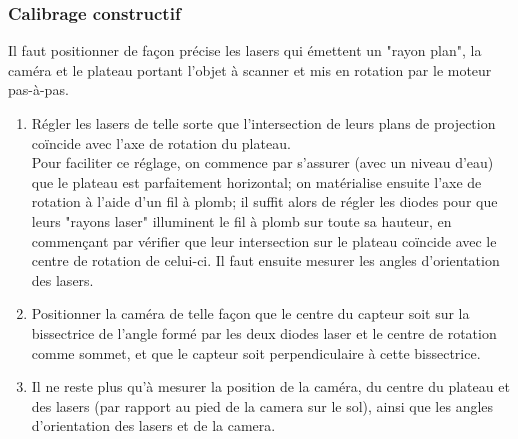 \documentclass[a4paper,10pt]{report}
\begin{document}
\subsubsection{Calibrage constructif}
Il faut positionner de façon précise les lasers qui émettent un "rayon plan", la caméra et le plateau portant l'objet à scanner et mis en rotation par le moteur pas-à-pas.
\begin{enumerate}
\item Régler les lasers de telle sorte que l'intersection de leurs plans de projection coïncide avec l'axe de rotation du plateau.\\
Pour faciliter ce réglage, on commence par s'assurer (avec un niveau d'eau) que le plateau est parfaitement horizontal; on matérialise ensuite l'axe de rotation à l'aide d'un fil à plomb; il suffit alors de régler les diodes pour que leurs "rayons laser" illuminent le fil à plomb sur toute sa hauteur, en commençant par vérifier que leur intersection sur le plateau coïncide avec le centre de rotation de celui-ci. Il faut ensuite mesurer les angles d'orientation des lasers.
\item Positionner la caméra de telle façon que le centre du capteur soit sur la bissectrice de l'angle formé par les deux diodes laser et le centre de rotation comme sommet, et que le capteur soit perpendiculaire à cette bissectrice.
\item Il ne reste plus qu'à mesurer la position de la caméra, du centre du plateau et des lasers (par rapport au pied de la camera sur le sol), ainsi que les angles d'orientation des lasers et de la camera.
\end{enumerate}
\end{document}
